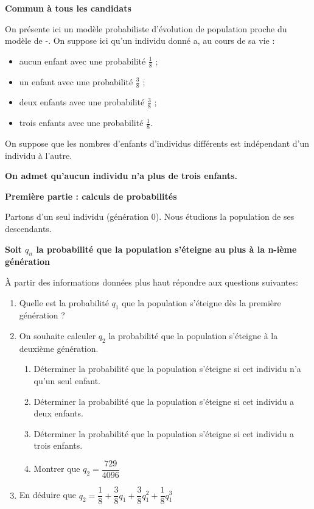 \documentclass[12pt,a4paper,french]{article}
\newcommand{\brm}[1]{\marginpar{\addpoints*{#1}}}%
\begin{document}
\vspace{4cm}
\newpage
\begin{question}
\vspace{-5.8mm}
\begin{center}\textbf{Commun à tous les candidats}\end{center}

On présente ici un modèle probabiliste d'évolution de population proche du
modèle de -. On suppose ici qu'un individu donné a,
au cours de sa vie :
\begin{itemize}
\item aucun enfant avec une probabilité $\frac18$ ;
\item un enfant avec une probabilité $\frac38$ ;
\item deux enfants avec une probabilité $\frac38$ ;
\item trois enfants avec une probabilité $\frac18$.
\end{itemize}
On suppose que les nombres d'enfants d'individus différents est indépendant d'un individu à l'autre.

{\bfseries On admet qu'aucun individu n'a plus de trois enfants.}


\textbf{Première partie : calculs de probabilités}

Partons d'un seul individu (génération 0). Nous étudions la population de ses
descendants.

{\bfseries Soit $q_{n}$ la probabilité que la population s'éteigne au plus à la n-ième génération}


\`A partir des informations données plus haut répondre aux questions suivantes:
\begin{enumerate}[itemsep=5pt]
\item Quelle est la probabilité $q_{1}$ que la population s'éteigne dès la première
génération ?%
\brm{0.25}

\item On souhaite calculer $q_{2}$ la probabilité que la population s'éteigne à la deuxième génération.
    \begin{enumerate}[itemsep=5pt]
      \item Déterminer la probabilité que la population s'éteigne si cet individu n'a qu'un seul enfant. \brm{0.25}
      \item Déterminer la probabilité que la population s'éteigne si cet individu a deux enfants. \brm{0.25}
      \item Déterminer la probabilité que la population s'éteigne si cet individu a trois enfants. \brm{0.25}
      \item Montrer que $q_{2}= \dfrac{729}{4096}$ \brm{0.5}
    \end{enumerate}
  \item En déduire que $q_{2}= \dfrac{1}{8}+\dfrac{3}{8}q_{1}+\dfrac{3}{8}q_{1}^{2}+\dfrac{1}{8} q_{1}^{3}$ \brm{0.5}
  

\end{enumerate}
\end{question}
\end{document}

